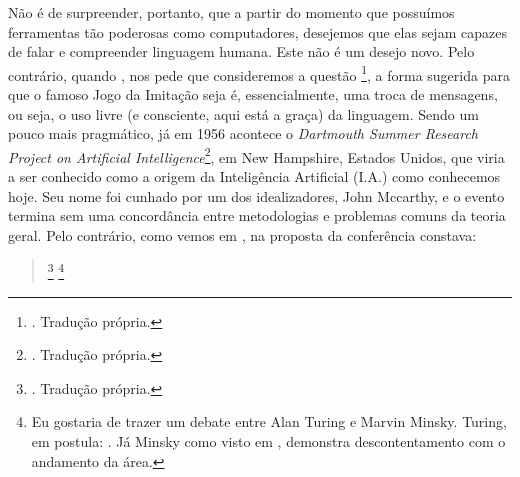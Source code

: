 Não é de surpreender, portanto, que a partir do momento que possuímos ferramentas tão poderosas como computadores, desejemos que elas sejam capazes de falar e compreender linguagem humana. Este não é um desejo novo. Pelo contrário, quando , nos pede que consideremos a questão \footnote{. Tradução própria.}, a forma sugerida para que o famoso Jogo da Imitação seja  é, essencialmente, uma troca de mensagens, ou seja, o uso livre (e consciente, aqui está a graça) da linguagem. Sendo um pouco mais pragmático, já em 1956 acontece o \textit{Dartmouth Summer Research Project on Artificial Intelligence}\footnote{. Tradução própria.}, em New Hampshire, Estados Unidos, que viria a ser conhecido como a origem da Inteligência Artificial (I.A.) como conhecemos hoje. Seu nome foi cunhado por um dos idealizadores, John Mccarthy, e o evento termina sem uma concordância entre metodologias e problemas comuns da teoria geral. Pelo contrário, como vemos em , na proposta da conferência constava:
\begin{quote}
    \footnote{. Tradução própria.}
    \footnote{Eu gostaria de trazer um debate entre Alan Turing e Marvin Minsky. Turing, em  postula: . Já Minsky como visto em , demonstra descontentamento com o andamento da área. }
\end{quote}


